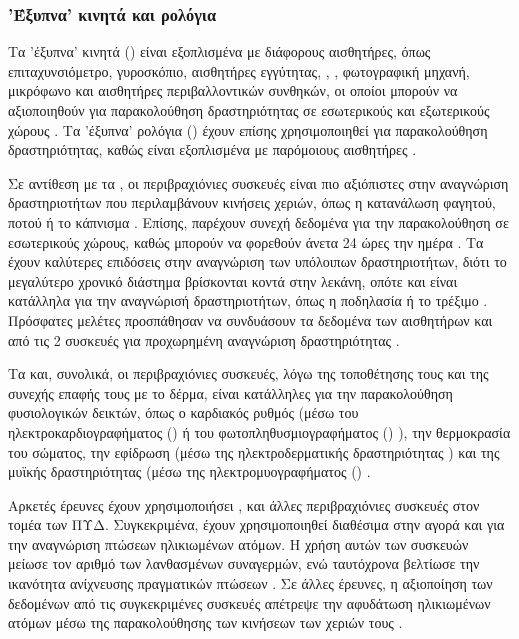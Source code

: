 \subsubsection{'Έξυπνα' κινητά και ρολόγια}
Τα 'έξυπνα' κινητά () είναι εξοπλισμένα με διάφορους αισθητήρες, όπως επιταχυνσιόμετρο, γυροσκόπιο, αισθητήρες εγγύτητας, , , φωτογραφική μηχανή, μικρόφωνο και αισθητήρες περιβαλλοντικών συνθηκών, οι οποίοι μπορούν να αξιοποιηθούν για παρακολούθηση δραστηριότητας σε εσωτερικούς και εξωτερικούς χώρους \cite{Incel2013}.
Τα 'έξυπνα' ρολόγια () έχουν επίσης χρησιμοποιηθεί για παρακολούθηση δραστηριότητας, καθώς είναι εξοπλισμένα με παρόμοιους αισθητήρες \cite{Chernbumroong2011}\cite{Sen2015}.
\par
Σε αντίθεση με τα , οι περιβραχιόνιες συσκευές είναι πιο αξιόπιστες στην αναγνώριση δραστηριοτήτων που περιλαμβάνουν κινήσεις χεριών, όπως η κατανάλωση φαγητού, ποτού ή το κάπνισμα \cite{Shoaib2016} .
Επίσης, παρέχουν συνεχή δεδομένα για την παρακολούθηση σε εσωτερικούς χώρους, καθώς μπορούν να φορεθούν άνετα 24 ώρες την ημέρα \cite{Bieber2013}\cite{Rawassizadeh2014}.
Τα  έχουν καλύτερες επιδόσεις στην αναγνώριση των υπόλοιπων δραστηριοτήτων, διότι το μεγαλύτερο χρονικό διάστημα βρίσκονται κοντά στην λεκάνη, οπότε και είναι κατάλληλα για την αναγνώρισή δραστηριοτήτων, όπως η ποδηλασία ή το τρέξιμο \cite{Shoaib2016}\cite{Bieber2013}.
Πρόσφατες μελέτες προσπάθησαν να συνδυάσουν τα δεδομένα των αισθητήρων και από τις 2 συσκευές για προχωρημένη αναγνώριση δραστηριότητας \cite{Shoaib2016}\cite{Casilari2015}.
\par
Τα  και, συνολικά, οι περιβραχιόνιες συσκευές, λόγω της τοποθέτησης τους και της συνεχής επαφής τους με το δέρμα, είναι κατάλληλες για την παρακολούθηση φυσιολογικών δεικτών, όπως ο καρδιακός ρυθμός (μέσω του ηλεκτροκαρδιογραφήματος () ή του φωτοπληθυσμιογραφήματος () ), την θερμοκρασία του σώματος, την εφίδρωση (μέσω της ηλεκτροδερματικής δραστηριότητας ) και της μυϊκής δραστηριότητας (μέσω της ηλεκτρομυογραφήματος () \cite{Rawassizadeh2014}\cite{Klonovs2016}.
\par
Αρκετές έρευνες έχουν χρησιμοποιήσει ,  και άλλες περιβραχιόνιες 
συσκευές στον τομέα των ΠΥΔ.
Συγκεκριμένα, έχουν χρησιμοποιηθεί διαθέσιμα στην αγορά  και  για την αναγνώριση πτώσεων ηλικιωμένων ατόμων.
Η χρήση αυτών των συσκευών μείωσε τον αριθμό των λανθασμένων συναγερμών, ενώ ταυτόχρονα βελτίωσε την ικανότητα ανίχνευσης πραγματικών πτώσεων \cite{Casilari2015}.
Σε άλλες έρευνες, η αξιοποίηση των δεδομένων από τις συγκεκριμένες συσκευές απέτρεψε την αφυδάτωση ηλικιωμένων ατόμων μέσω της παρακολούθησης των κινήσεων των χεριών τους \cite{Lutze2015}.

